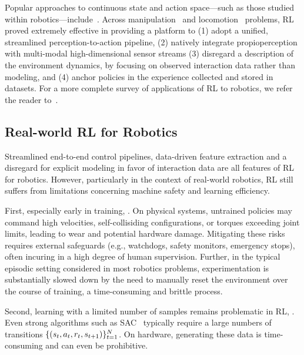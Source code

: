 Popular approaches to continuous state and action space---such as those studied within robotics---include~\citet{schulmanTrustRegionPolicy2017, schulmanProximalPolicyOptimization2017, haarnojaSoftActorCriticOffPolicy2018}.
Across manipulation~\citep{akkayaSolvingRubiksCube2019} and locomotion~\citep{leeLearningQuadrupedalLocomotion2020} problems, RL proved extremely effective in providing a platform to (1) adopt a unified, streamlined perception-to-action pipeline, (2) natively integrate propioperception with multi-modal high-dimensional sensor streams  (3) disregard a description of the environment dynamics, by focusing on observed interaction data rather than modeling, and (4) anchor policies in the experience collected and stored in datasets.
For a more complete survey of applications of RL to robotics, we refer the reader to~\citet{koberReinforcementLearningRobotics,tangDeepReinforcementLearning2024}.

\subsection{Real-world RL for Robotics}
Streamlined end-to-end control pipelines, data-driven feature extraction and a disregard for explicit modeling in favor of interaction data are all features of RL for robotics.
However, particularly in the context of real-world robotics, RL still suffers from limitations concerning machine safety and learning efficiency.

First, especially early in training, .
On physical systems, untrained policies may command high velocities, self-collisiding configurations, or torques exceeding joint limits, leading to wear and potential hardware damage.
Mitigating these risks requires external safeguards (e.g., watchdogs, safety monitors, emergency stops), often incuring in a high degree of human supervision.
Further, in the typical episodic setting considered in most robotics problems, experimentation is substantially slowed down by the need to manually reset the environment over the course of training, a time-consuming and brittle process.

Second, learning with a limited number of samples remains problematic in RL, .
Even strong algorithms such as SAC~\citep{haarnojaSoftActorCriticOffPolicy2018} typically require a large numbers of transitions \( \{ (s_t, a_t, r_t, s_{t+1}) \}_{t=1}^N \).
On hardware, generating these data is time-consuming and can even be prohibitive.

